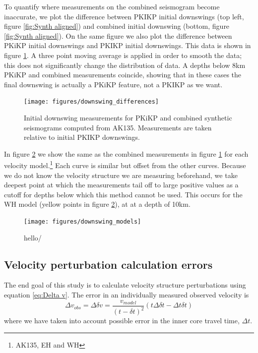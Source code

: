 \documentclass[11pt,a4paper]{article}
\begin{document}
To quantify where measurements on the combined seismogram become inaccurate, we plot the difference between PKIKP initial downswings (top left, figure \ref{fig:Synth aligned}) and combined initial downswing (bottom, figure \ref{fig:Synth aligned}). On the same figure we also plot the difference between PKiKP initial downswings and PKIKP initial downswings. This data is shown in figure \ref{fig:Downswing differences}. A three point moving average is applied in order to smooth the data; this does not significantly change the distribution of data. A depths below 8km PKiKP and combined measurements coincide, showing that in these cases the final downswing is actually a PKiKP feature, not a PKIKP as we want.

\begin{figure}
	\centering
	\texttt{[image: figures/downswing\_differences]}
	\caption{Initial downswing measurements for PKiKP and combined synthetic seismograms computed from AK135. Measurements are taken relative to initial PKIKP downswings.}
	\label{fig:Downswing differences}
\end{figure}

In figure \ref{fig:Downswing models} we show the same as the combined measurements in figure \ref{fig:Downswing differences} for each velocity model.\footnote{AK135, EH and WH} Each curve is similar but offset from the other curves. Because we do not know the velocity structure we are measuring beforehand, we take deepest point at which the measurements tail off to large positive values as a cutoff for depths below which this method cannot be used. This occurs for the WH model (yellow points in figure \ref{fig:Downswing models}), at at a depth of 10km.

\begin{figure}
	\centering
	\texttt{[image: figures/downswing\_models]}
	\caption{hello/}
	\label{fig:Downswing models}
\end{figure}

\subsection{Velocity perturbation calculation errors}
The end goal of this study is to calculate velocity structure perturbations using equation \eqref{eq:Delta v}. The error in an individually measured observed velocity is
\begin{equation}
	\Delta v_{obs} = \Delta \delta v = \frac{v_{model}}{\left( t - \delta t\right )^{2}} \left ( t\Delta \delta t - \Delta t \delta t \right )
	\label{eq:Velocity error}
\end{equation}
where we have taken into account possible error in the inner core travel time, $\Delta t$.
\end{document}

